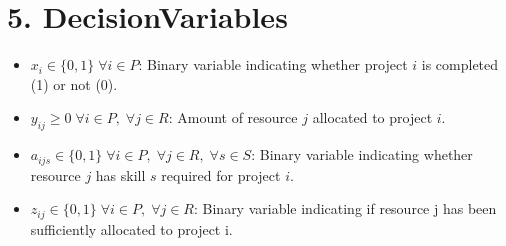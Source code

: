 \documentclass{article}
\begin{document}
\section{5. DecisionVariables}

\begin{itemize}
    \item $x_i \in \{0, 1\} \; \forall i \in P$: Binary variable indicating whether project $i$ is completed (1) or not (0).
    \item $y_{ij} \ge 0 \; \forall i \in P, \; \forall j \in R$:  Amount of resource $j$ allocated to project $i$.
    \item $a_{ijs} \in \{0, 1\} \; \forall i \in P, \; \forall j \in R, \; \forall s \in S$: Binary variable indicating whether resource $j$ has skill $s$ required for project $i$.
    \item $z_{ij} \in \{0, 1\} \; \forall i \in P, \; \forall j \in R$: Binary variable indicating if resource j has been sufficiently allocated to project i.
\end{itemize}
\end{document}
